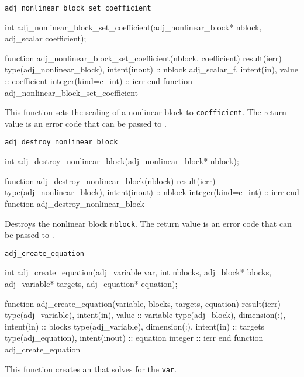 \begin{boxwithtitle}{\texttt{adj_nonlinear_block_set_coefficient}}
\begin{minipage}{\columnwidth}
\begin{ccode}
  int adj_nonlinear_block_set_coefficient(adj_nonlinear_block* nblock, 
                                          adj_scalar coefficient);
\end{ccode}
\begin{fortrancode}
  function adj_nonlinear_block_set_coefficient(nblock, coefficient) result(ierr) 
    type(adj_nonlinear_block), intent(inout) :: nblock
    adj_scalar_f, intent(in), value :: coefficient
    integer(kind=c_int) :: ierr
  end function adj_nonlinear_block_set_coefficient
\end{fortrancode}
\end{minipage}
\end{boxwithtitle}
This function sets the scaling of a nonlinear block to \texttt{coefficient}. 
The return value is an error code that can be passed to .


\begin{boxwithtitle}{\texttt{adj_destroy_nonlinear_block}}
\begin{minipage}{\columnwidth}
\begin{ccode}
  int adj_destroy_nonlinear_block(adj_nonlinear_block* nblock);
\end{ccode}
\begin{fortrancode}
  function adj_destroy_nonlinear_block(nblock) result(ierr)
    type(adj_nonlinear_block), intent(inout) :: nblock
    integer(kind=c_int) :: ierr
  end function adj_destroy_nonlinear_block
\end{fortrancode}
\end{minipage}
\end{boxwithtitle}
Destroys the nonlinear block \texttt{nblock}.
The return value is an error code that can be passed to .


\begin{boxwithtitle}{\texttt{adj_create_equation}}
\begin{minipage}{\columnwidth}
\begin{ccode}
  int adj_create_equation(adj_variable var, int nblocks, adj_block* blocks, 
                          adj_variable* targets, adj_equation* equation);
\end{ccode}
\begin{fortrancode}
  function adj_create_equation(variable, blocks, targets, equation) result(ierr)
    type(adj_variable), intent(in), value :: variable
    type(adj_block), dimension(:), intent(in) :: blocks
    type(adj_variable), dimension(:), intent(in) :: targets
    type(adj_equation), intent(inout) :: equation
    integer :: ierr
  end function adj_create_equation
\end{fortrancode}
\end{minipage}
\end{boxwithtitle}
This function creates an  that solves for the  \texttt{var}.


